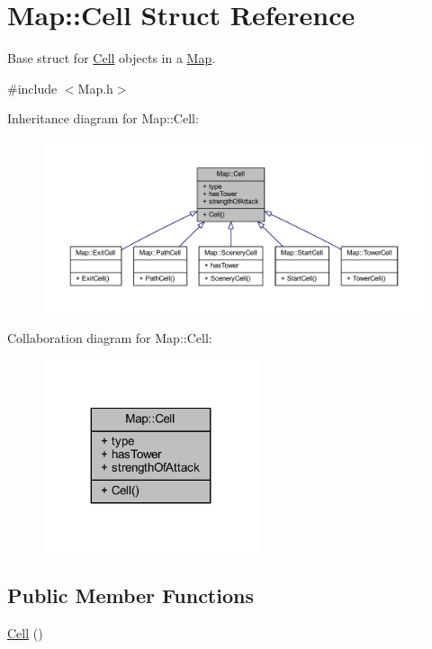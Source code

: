 \hypertarget{struct_map_1_1_cell}{\section{Map\+:\+:Cell Struct Reference}
\label{struct_map_1_1_cell}
}


Base struct for \hyperlink{struct_map_1_1_cell}{Cell} objects in a \hyperlink{class_map}{Map}.  




{\ttfamily \#include $<$Map.\+h$>$}



Inheritance diagram for Map\+:\+:Cell\+:
\nopagebreak
\begin{figure}[H]
\begin{center}
\leavevmode
\includegraphics[width=350pt]{struct_map_1_1_cell__inherit__graph}
\end{center}
\end{figure}


Collaboration diagram for Map\+:\+:Cell\+:
\nopagebreak
\begin{figure}[H]
\begin{center}
\leavevmode
\includegraphics[width=179pt]{struct_map_1_1_cell__coll__graph}
\end{center}
\end{figure}
\subsection*{Public Member Functions}
\begin{DoxyCompactItemize}
\item 
\hyperlink{struct_map_1_1_cell_a1264b2260fee132a303effb0f95aab02}{Cell} ()
\end{DoxyCompactItemize}
